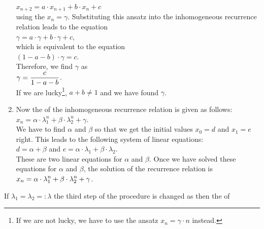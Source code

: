 \begin{enumerate}
      \hspace*{1.3cm}
      $x_{n+2} = a \cdot x_{n+1} + b \cdot x_n + c$
      \\[0.2cm]
      using the  $x_n = \gamma$.  Substituting this ansatz into the inhomogeneous recurrence
      relation leads to the equation
      \\[0.2cm]
      \hspace*{1.3cm}
      $\gamma = a \cdot \gamma + b \cdot \gamma + c$,
      \\[0.2cm]
      which is equivalent to the equation
      \\[0.2cm]
      \hspace*{1.3cm}
      $(1 - a - b) \cdot \gamma = c$.
      \\[0.2cm]
      Therefore, we find $\gamma$ as
      \\[0.2cm]
      \hspace*{1.3cm}
      $\displaystyle \gamma = \frac{c}{1 - a - b}$.
      \\[0.2cm]
      If we are lucky\footnote{
        If we are not lucky, we have to use the ansatz $x_n = \gamma \cdot n$ instead.
      },
      $a + b \not= 1$ and we have found $\gamma$.
\item Now the  of the inhomogeneous recurrence relation is given as follows:
      \\[0.2cm]
      \hspace*{1.3cm}
      $x_n = \alpha \cdot \lambda_1^n + \beta \cdot \lambda_2^n + \gamma$.
      \\[0.2cm]
      We have to find $\alpha$ and $\beta$ so that we get the initial values $x_0 = d$ and $x_1 = e$ right.
      This leads to the 
      following system of linear equations:
      \\[0.2cm]
      \hspace*{1.3cm}
      $d = \alpha + \beta$ \quad and \quad $e = \alpha \cdot \lambda_1 + \beta \cdot \lambda_2$.
      \\[0.2cm]
      These are two linear equations for $\alpha$ and $\beta$.  Once we have solved these equations for $\alpha$ and
      $\beta$, the solution of the recurrence relation is
      \\[0.2cm]
      \hspace*{1.3cm}
      $\displaystyle x_{n} = \alpha \cdot \lambda_1^n + \beta \cdot \lambda_2^n + \gamma$.
\end{enumerate}
If $\lambda_1 = \lambda_2 =: \lambda$ the third step of the procedure is changed as then the  of
